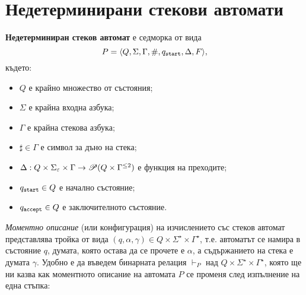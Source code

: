 \section{Недетерминирани стекови автомати}

{\bf Недетерминиран стеков автомат} е седморка от вида
\[P = \PDA,\] където:
\begin{itemize}
\item
  $Q$ е крайно множество от състояния;
\item  
  $\Sigma$ е крайна входна азбука;
\item
  $\Gamma$ е крайна стекова азбука;
\item
  $\sharp \in \Gamma$ е символ за дъно на стека;
\item
  $\Delta:Q\times\Sigma_\varepsilon\times \Gamma \rightarrow \Ps(Q\times\Gamma^{\leq 2})$ 
  е функция на преходите;    
\item
  $\qstart \in Q$ е начално състояние;
\item
  $\qaccept \in Q$ е заключителното състояние.
\end{itemize}

{\em Моментно описание} (или конфигурация) на изчислението със стеков автомат представлява тройка от вида $(q,\alpha,\gamma) \in Q\times\Sigma^\star\times\Gamma^\star$,
т.е. автоматът се намира в състояние $q$, думата, която остава да се прочете е $\alpha$,
а съдържанието на стека е думата $\gamma$.
Удобно е да въведем бинарната релация $\vdash_P$ над $Q\times\Sigma^\star\times\Gamma^\star$,
която ще ни казва как моментното описание на автомата $P$ се променя след изпълнение на една стъпка:

\begin{figure}[H]
  \begin{subfigure}[b]{0.5\textwidth}
    \begin{prooftree}
    \end{prooftree}
  \end{subfigure}
  ~
  \begin{subfigure}[b]{0.5\textwidth}
    \begin{prooftree}
    \end{prooftree}
  \end{subfigure}
\end{figure}

